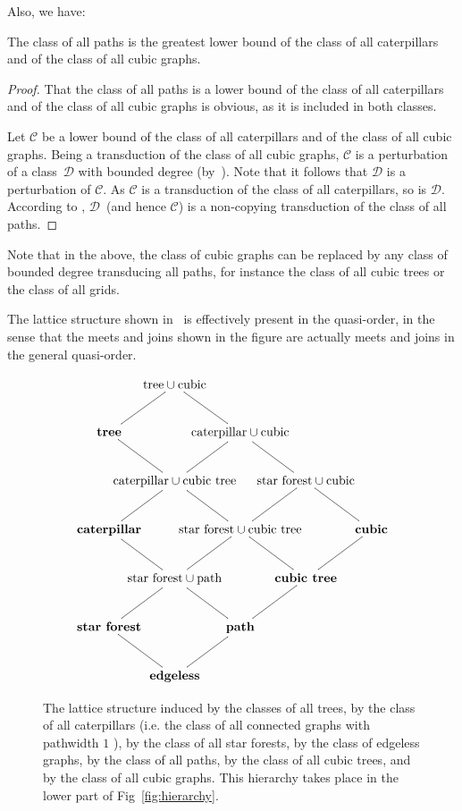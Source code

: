 \documentclass{lmcs}
\newcommand{\Cc}{\mathscr{C}}
\newcommand{\Dd}{\mathscr{D}}
\theoremstyle{definition}
\begin{document}
Also, we have:
\begin{exa}
	\label{ex:P}
	The class of all paths is the greatest lower bound of the class of all caterpillars  and of the class of all cubic graphs.
\end{exa}
\begin{proof}
	That the class of all paths is a lower bound of the class of all caterpillars  and of the class of all cubic graphs is obvious, as it is included in both classes.
	
	Let  $\Cc$ be a lower bound  of the class of all caterpillars  and of the class of all cubic graphs.
	Being a transduction of the class of all cubic graphs, $\Cc$ is a perturbation of a class~$\Dd$ with bounded degree (by~). Note that it follows that $\Dd$ is a perturbation of $\Cc$.
	As $\Cc$ is a transduction of the class of all caterpillars, so is $\Dd$.
	According to , $\Dd$~(and hence $\Cc$)  is a non-copying transduction of  the class of all paths.
\end{proof}
Note that in the above, the class of cubic graphs can be replaced by any class of bounded degree transducing all paths, for instance the class of all cubic trees or the class of all grids.

The lattice structure shown in~ is effectively present in the quasi-order, in the sense that the meets and joins shown in the figure are actually meets and joins in the general quasi-order. 



\begin{figure}[ht]
$$\xy
\xymatrix@!C=1cm{
	&\text{\scriptsize tree} \cup\text{\scriptsize cubic}\ar@{-}[dl]\ar@{-}[dr]\\
	\text{\scriptsize\bf tree}\ar@{-}[dr]&&\text{\scriptsize caterpillar}\cup\text{\scriptsize cubic}\ar@{-}[dl]\ar@{-}[dr]\\
	&\text{\scriptsize caterpillar} \cup\text{\scriptsize cubic tree}\ar@{-}[dl]\ar@{-}[dr]&&\text{\scriptsize star forest}\cup\text{\scriptsize cubic}\ar@{-}[dl]\ar@{-}[dr]\\
	\text{\scriptsize\bf caterpillar}\ar@{-}[dr]&&\text{\scriptsize star forest}\cup\text{\scriptsize cubic tree}\ar@{-}[dl]\ar@{-}[dr]&&\text{\scriptsize\bf cubic}\ar@{-}[dl]\\
	&\text{\scriptsize star forest}\cup\text{\scriptsize path}\ar@{-}[dl]\ar@{-}[dr]&&\text{\scriptsize\bf cubic tree}\ar@{-}[dl]\\
	\text{\scriptsize\bf  star forest}\ar@{-}[dr]&&\text{\scriptsize\bf path}\ar@{-}[dl]\\
	&\text{\scriptsize\bf edgeless}
}
\endxy$$
\caption{The lattice structure induced by the classes of all trees, by the class of all caterpillars (i.e. the class of all connected graphs with pathwidth $1$ \cite{proskurowski1999classes}), by the class of all star forests, by the class of edgeless graphs, by the class of all paths, by the class of all cubic trees, and by the class of all cubic graphs.
This hierarchy takes place in the lower part of Fig~\ref{fig:hierarchy}.}
\label{fig:lattice}
\end{figure}
\end{document}
